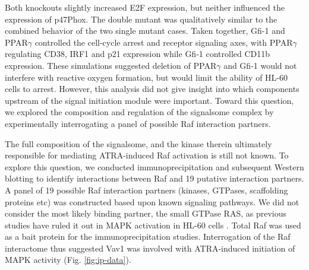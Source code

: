 \documentclass[12pt]{article}
\begin{document}
Both knockouts slightly increased E2F expression, but neither influenced the expression of p47Phox.
The double mutant was qualitatively similar to the combined behavior of the two single mutant cases.
Taken together, Gfi-1 and PPAR$\gamma$ controlled the cell-cycle arrest and receptor signaling axes, with PPAR$\gamma$ regulating CD38, IRF1 and p21 expression
while Gfi-1 controlled CD11b expression. These simulations suggested deletion of PPAR$\gamma$ and Gfi-1 would not interfere with reactive oxygen formation,
but would limit the ability of HL-60 cells to arrest.
However, this analysis did not give insight into which components upstream of the signal initiation module were important.
Toward this question, we explored the composition and regulation of the signalsome complex by experimentally interrogating a panel of possible Raf interaction partners.


The full composition of the signalsome, and the kinase therein ultimately responsible for mediating ATRA-induced Raf activation is still not known.
To explore this question, we conducted immunoprecipitation and subsequent Western blotting to identify interactions between Raf and 19 putative interaction partners.
A panel of 19 possible Raf interaction partners (kinases, GTPases, scaffolding proteins etc)
was constructed based upon known signaling pathways.
We did not consider the most likely binding partner,
the small GTPase RAS, as previous studies have ruled it out in MAPK activation in HL-60 cells \cite{Wang2008,Katagiri1994}.
Total Raf was used as a bait protein for the immunoprecipitation studies.
Interrogation of the Raf interactome thus suggested Vav1 was involved with ATRA-induced initiation of MAPK activity (Fig. \ref{fig:ip-data}).
\end{document}

